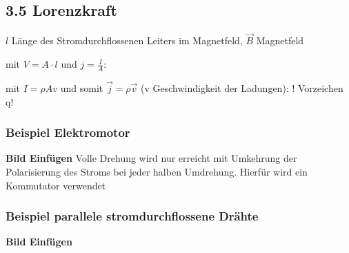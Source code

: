 \subsection*{3.5 Lorenzkraft}
    $l$ Länge des Stromdurchflossenen Leiters im Magnetfeld, $\overrightarrow{B}$ Magnetfeld
    
    mit $V = A \cdot l$ und $j = \frac{I}{A}$:

    mit $I = \rho A v$ und somit $\overrightarrow{j} = \rho \overrightarrow{v}$ (v Geschwindigkeit der Ladungen):
    ! Vorzeichen q!

    \subsubsection*{Beispiel Elektromotor}
        \textbf{Bild Einfügen}
        Volle Drehung wird nur erreicht mit Umkehrung der Polarisierung des Stroms bei jeder halben Umdrehung. Hierfür wird ein Kommutator verwendet
    
    \subsubsection*{Beispiel parallele stromdurchflossene Drähte}
        \textbf{Bild Einfügen}
        
